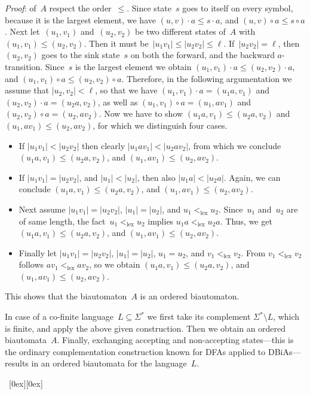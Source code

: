 \documentclass[submission]{eptcs}
\newcommand{\dfa}{\textrm{DFA}}
\newcommand{\dbia}{\textrm{DBiA}}
\newcommand{\abs}[1]{\left\lvert{#1}\right\rvert}
\newcommand*{\qed}{\raisebox{0.5ex}[0ex][0ex]{\framebox[1ex][l]{}}}
\newenvironment{proof}{\par\noindent
  {\rmfamily\itshape\mdseries Proof\/}:\hspace{\labelsep}\ignorespaces}{\mbox{}\nolinebreak\hfill~{\qed}
  \medbreak
}
\begin{document}
\begin{proof}
  of~$A$ respect the order~$\leq$.  Since state~$s$ goes to itself on
  every symbol, because it is the largest element, we have $(u,v)\cdot
  a \leq s\cdot a$, and $(u,v)\circ a \leq s\circ a$.  Next
  let~$(u_1,v_1)$ and~$(u_2,v_2)$ be two different states of~$A$ with
  $(u_1,v_1)\leq (u_2,v_2)$.  Then it must be~$\abs{u_1v_1}\leq
  \abs{u_2v_2}\leq \ell$.  If~$\abs{u_2v_2} = \ell$, then~$(u_2,v_2)$
  goes to the sink state~$s$ on both the forward, and the backward
  $a$-transition.  Since~$s$ is the largest element we obtain
  $(u_1,v_1)\cdot a \leq (u_2,v_2)\cdot a$, and $(u_1,v_1)\circ a \leq
  (u_2,v_2)\circ a$.  Therefore, in the following argumentation we
  assume that $\abs{u_2,v_2}<\ell$, so that we have $(u_1,v_1)\cdot a
  = (u_1a,v_1)$ and $(u_2,v_2)\cdot a = (u_2a,v_2)$, as well as
  $(u_1,v_1)\circ a = (u_1,av_1)$ and $(u_2,v_2)\circ a = (u_2,av_2)$.
  Now we have to show $(u_1a,v_1)\leq (u_2a,v_2)$ and $(u_1,av_1)\leq
  (u_2,av_2)$, for which we distinguish four cases.
  \begin{itemize}
  \item If $\abs{u_1v_1} < \abs{u_2v_2}$ then clearly $\abs{u_1av_1} <
    \abs{u_2av_2}$, from which we conclude $(u_1a,v_1) \leq
    (u_2a,v_2)$, and $(u_1,av_1) \leq (u_2,av_2)$.
  \item If $\abs{u_1v_1} = \abs{u_2v_2}$, and $\abs{u_1} < \abs{u_2}$,
    then also $\abs{u_1a} < \abs{u_2a}$.  Again, we can conclude
    $(u_1a,v_1)\leq (u_2a,v_2)$, and $(u_1,av_1)\leq (u_2,av_2)$.
  \item Next assume $\abs{u_1v_1} = \abs{u_2v_2}$, $\abs{u_1} =
    \abs{u_2}$, and $u_1 <_{\text{lex}} u_2$.  Since~$u_1$ and~$u_2$
    are of same length, the fact~$u_1 <_{\text{lex}} u_2$ implies
    $u_1a <_{\text{lex}} u_2a$.  Thus, we get $(u_1a,v_1)\leq
    (u_2a,v_2)$, and $(u_1,av_1)\leq (u_2,av_2)$.
  \item Finally let $\abs{u_1v_1} = \abs{u_2v_2}$, $\abs{u_1} =
    \abs{u_2}$, $u_1 = u_2$, and $v_1 <_{\text{lex}} v_2$.  From $v_1
    <_{\text{lex}} v_2$ follows $av_1 <_{\text{lex}} av_2$, so we
    obtain $(u_1a,v_1)\leq (u_2a,v_2)$, and $(u_1,av_1)\leq
    (u_2,av_2)$.
  \end{itemize}
  This shows that the biautomaton~$A$ is an ordered biautomaton.

  In case of a co-finite language~$L\subseteq\Sigma^*$ we first take
  its complement $\Sigma^*\setminus L$, which is finite, and apply the
  above given construction. Then we obtain an ordered
  biautomata~$A$. Finally, exchanging accepting and non-accepting
  states---this is the ordinary complementation construction known for
  \dfa s applied to \dbia s---results in an ordered biautomata for the
  language~$L$.


\end{proof}
\end{document}
